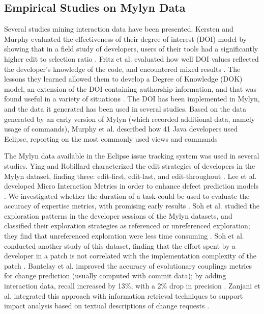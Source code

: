 \documentclass[times]{smrauth}
\begin{document}
\subsection{Empirical Studies on Mylyn Data}

Several studies mining interaction data have been presented. Kersten and Murphy evaluated the effectiveness of their degree of interest (DOI) model by showing that in a field study of developers, users of their tools had a significantly higher edit to selection ratio \cite{KM06}. Fritz et al. evaluated how well DOI values reflected the developer’s knowledge of the code, and encountered mixed results \cite{FMH07}. The lessons they learned allowed them to develop a Degree of Knowledge (DOK) model, an extension of the DOI containing authorship information, and that was found useful in a variety of situations \cite{FOMM10}. The DOI has been implemented in Mylyn, and the data it generated has been used in several studies. Based on the data generated by an early version of Mylyn (which recorded additional data, namely usage of commands), Murphy et al. described how 41 Java developers used Eclipse, reporting on the most commonly used views and commands \cite{MKF06}

The Mylyn data available in the Eclipse issue tracking system was used in several studies. Ying and Robillard characterized the edit strategies of developers in the Mylyn dataset, finding three: edit-first, edit-last, and edit-throughout \cite{YR11}. Lee et al. developed Micro Interaction Metrics in order to enhance defect prediction models \cite{LJD11}. We investigated whether the duration of a task could be used to evaluate the accuracy of expertise metrics, with promising early results \cite{RD13}. Soh et al. studied the exploration patterns in the developer sessions of the Mylyn datasets, and classified their exploration strategies as referenced or unreferenced exploration; they find that unreferenced exploration were less time consuming \cite{SKGAA13}. Soh et al. conducted another study of this dataset, finding that the effort spent by a developer in a patch is not correlated with the implementation complexity of the patch \cite{SKGA13}. Bantelay et al. improved the accuracy of evolutionary couplings metrics for change prediction (usually computed with commit data); by adding interaction data, recall increased by 13\%, with a 2\% drop in precision \cite{BZK13}. Zanjani et al. integrated this approach with information retrieval techniques to support impact analysis based on textual descriptions of change requests \cite{ZSK14}.
\end{document}
